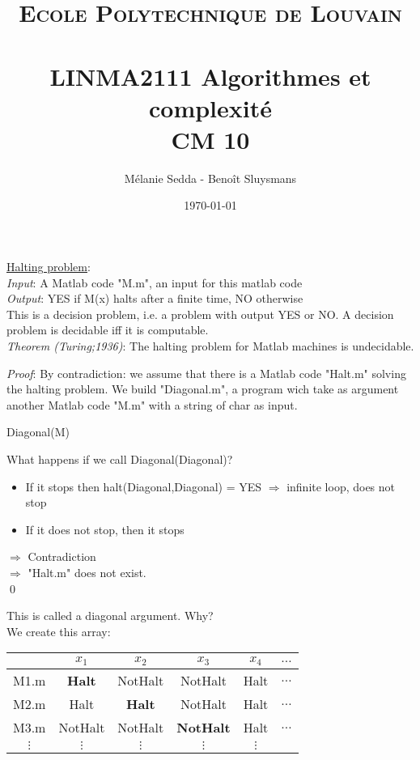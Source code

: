 \documentclass[paper=a4, fontsize=11pt]{scrartcl}
\title{	
\normalfont \normalsize 
\textsc{Ecole Polytechnique de Louvain} \\ [25pt]
\horrule{0.5pt} \\[0.4cm] 
\huge LINMA2111 Algorithmes et complexité \\ CM 10
\horrule{0.5pt} \\[0.4cm]
}
\author{Mélanie Sedda - Benoît Sluysmans}
\date{\normalsize\today}
\numberwithin{equation}{section} %
\numberwithin{figure}{section} %
\numberwithin{table}{section} %
\begin{document}
\maketitle


\underline{Halting problem}:\\
\textit{Input}: A Matlab code "M.m", an input for this matlab code\\
\textit{Output}: YES if M(x) halts after a finite time, NO otherwise\\

This is a decision problem, i.e. a problem with output YES or NO. A decision problem is decidable iff it is computable.\\


\textit{Theorem (Turing;1936)}: The halting problem for Matlab machines is undecidable.

\textit{Proof}: By contradiction: we assume that there is a Matlab code "Halt.m" solving the halting problem. We build "Diagonal.m", a program wich take as argument another Matlab code "M.m" with a string of char as input.

\begin{algorithm}
\caption{Diagonal(M)}
\begin{algorithmic}
\ELSE
\ENDIF
\end{algorithmic}
\end{algorithm}


What happens if we call Diagonal(Diagonal)?
\begin{itemize}
\item If it stops then halt(Diagonal,Diagonal) = YES $\Rightarrow$ infinite loop, does not stop
\item If it does not stop, then it stops
\end{itemize}
$\Rightarrow$ Contradiction\\
$\Rightarrow$ "Halt.m" does not exist.\\ \qed

This is called a diagonal argument. Why?\\
We create this array:
\begin{tabular}{c|ccccc}
	& $x_1$ & $x_2$ & $x_3$ & $x_4$ & $\hdots$ \\
  \hline
 	M1.m & \textbf{Halt} & NotHalt & NotHalt & Halt & $\hdots$  \\
 	M2.m & Halt & \textbf{Halt} & NotHalt & Halt & $\hdots$  \\
 	M3.m & NotHalt & NotHalt & \textbf{NotHalt} & Halt & $\hdots$  \\
 	$\vdots$ & $\vdots$ & $\vdots$ & $\vdots$ & $\vdots$ &  \\
\end{tabular}
\end{document}
